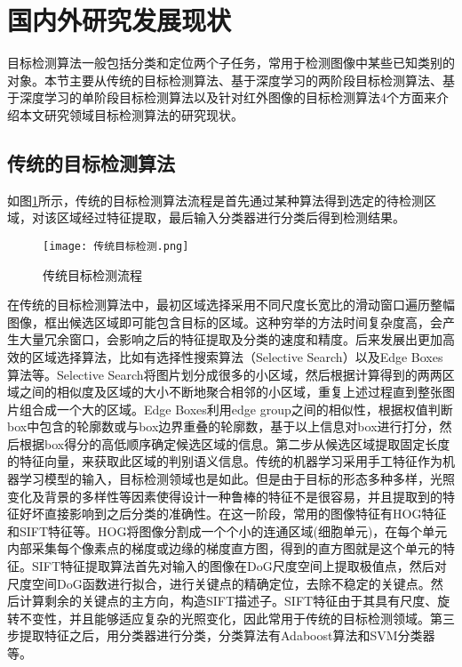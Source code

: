 \section{国内外研究发展现状}
目标检测算法一般包括分类和定位两个子任务，常用于检测图像中某些已知类别的对象。本节主要从传统的目标检测算法、基于深度学习的两阶段目标检测算法、基于深度学习的单阶段目标检测算法以及针对红外图像的目标检测算法4个方面来介绍本文研究领域目标检测算法的研究现状\cite{尹宏鹏2016基于视觉的目标检测与跟踪综述}。

\subsection{传统的目标检测算法}
如图\ref{ct}所示，传统的目标检测算法流程是首先通过某种算法得到选定的待检测区域，对该区域经过特征提取，最后输入分类器进行分类后得到检测结果。

\begin{figure}[htbp]
    \centering
    \texttt{[image: 传统目标检测.png]}
    \caption{传统目标检测流程}
    \label{ct}
\end{figure}

在传统的目标检测算法中，最初区域选择采用不同尺度长宽比的滑动窗口遍历整幅图像，框出候选区域即可能包含目标的区域\cite{胡伏原2020基于卷积神经网络的目标检测算法综述,kira1992feature}。这种穷举的方法时间复杂度高，会产生大量冗余窗口，会影响之后的特征提取及分类的速度和精度。后来发展出更加高效的区域选择算法，比如有选择性搜索算法（Selective Search）\cite{uijlings2013selective}以及Edge Boxes算法\cite{zitnick2014edge}等。Selective Search将图片划分成很多的小区域，然后根据计算得到的两两区域之间的相似度及区域的大小不断地聚合相邻的小区域，重复上述过程直到整张图片组合成一个大的区域。Edge Boxes利用edge group之间的相似性，根据权值判断box中包含的轮廓数或与box边界重叠的轮廓数，基于以上信息对box进行打分，然后根据box得分的高低顺序确定候选区域的信息。第二步从候选区域提取固定长度的特征向量，来获取此区域的判别语义信息。传统的机器学习采用手工特征作为机器学习模型的输入，目标检测领域也是如此。但是由于目标的形态多种多样，光照变化及背景的多样性等因素使得设计一种鲁棒的特征不是很容易，并且提取到的特征好坏直接影响到之后分类的准确性。在这一阶段，常用的图像特征有HOG特征\cite{he1990texture}和SIFT特征\cite{lowe1999object}等。HOG将图像分割成一个个小的连通区域(细胞单元)，在每个单元内部采集每个像素点的梯度或边缘的梯度直方图，得到的直方图就是这个单元的特征。SIFT特征提取算法首先对输入的图像在DoG尺度空间上提取极值点，然后对尺度空间DoG函数进行拟合，进行关键点的精确定位，去除不稳定的关键点。然后计算剩余的关键点的主方向，构造SIFT描述子。SIFT特征由于其具有尺度、旋转不变性，并且能够适应复杂的光照变化，因此常用于传统的目标检测领域。第三步提取特征之后，用分类器进行分类，分类算法有Adaboost算法\cite{freund1997decision}和SVM分类器\cite{cortes1995support}等。


